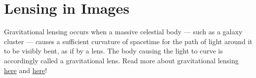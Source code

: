 \documentclass[14pt]{article}
\newcommand\kw[1]{{\color{teal}#1}}
\begin{document}

\section{Lensing in Images}
\label{a:lensing}

Gravitational lensing occurs when a massive celestial body — such as a galaxy cluster — causes a sufficient curvature of spacetime for the path of light around it to be visibly bent, as if by a lens. The body causing the light to curve is accordingly called a gravitational lens. Read more about gravitational lensing \href{https://esahubble.org/wordbank/gravitational-lensing/}{here} and \href{https://esahubble.org/science/gravitational_lensing/}{here}!
\end{document}
